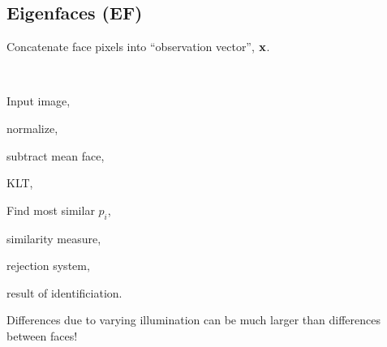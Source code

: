 \begin{compactdesc}
	\section{Eigenfaces (EF)}
	Concatenate face pixels into ``observation vector'', $\bm{\mathrm{x}}$.
\item[\lp{EI for recognition}]\hfill\\
	\begin{enumerate*}[label=\protect\circled{\arabic*},itemjoin=]
		\item Input image,\\
		\item normalize,\\
		\item subtract mean face,\\
		\item KLT,\\
		\item Find most similar $p_i$,\\
		\item similarity measure,\\
		\item rejection system,\\
		\item result of identificiation.\\
	\end{enumerate*}
\item[\lp{Limitations of EFs}] Differences due to varying illumination can be much larger than differences between faces!

\end{compactdesc}
